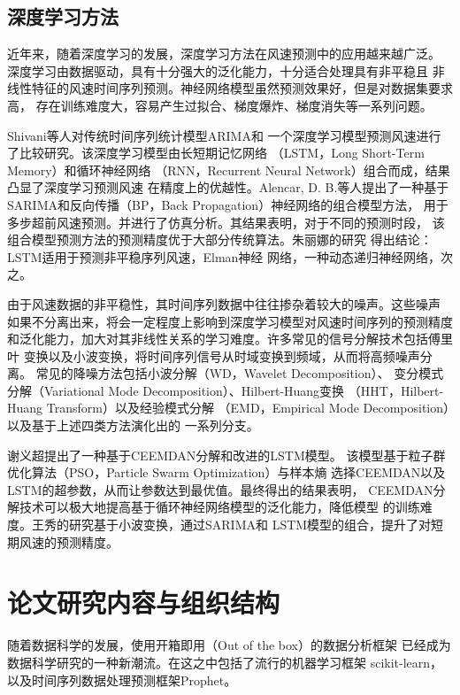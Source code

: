 \documentclass[AutoFakeBold]{LZUThesis}
\begin{document}
\subsection{深度学习方法}

近年来，随着深度学习的发展，深度学习方法在风速预测中的应用越来越广泛。
深度学习由数据驱动，具有十分强大的泛化能力，十分适合处理具有非平稳且
非线性特征的风速时间序列预测。神经网络模型虽然预测效果好，但是对数据集要求高，
存在训练难度大，容易产生过拟合、梯度爆炸、梯度消失等一系列问题。

Shivani等人对传统时间序列统计模型ARIMA和
一个深度学习模型预测风速进行了比较研究。该深度学习模型由长短期记忆网络
（LSTM，Long Short-Term Memory）和循环神经网络
（RNN，Recurrent Neural Network）组合而成，结果凸显了深度学习预测风速
在精度上的优越性。Alencar, D. B.等人提出了一种基于
SARIMA和反向传播（BP，Back Propagation）神经网络的组合模型方法，
用于多步超前风速预测。并进行了仿真分析。其结果表明，对于不同的预测时段，
该组合模型预测方法的预测精度优于大部分传统算法。朱丽娜的研究
得出结论：LSTM适用于预测非平稳序列风速，Elman神经
网络，一种动态递归神经网络，次之。

由于风速数据的非平稳性，其时间序列数据中往往掺杂着较大的噪声。这些噪声
如果不分离出来，将会一定程度上影响到深度学习模型对风速时间序列的预测精度
和泛化能力，加大对其非线性关系的学习难度。许多常见的信号分解技术包括傅里叶
变换以及小波变换，将时间序列信号从时域变换到频域，从而将高频噪声分离。
常见的降噪方法包括小波分解（WD，Wavelet Decomposition）、
变分模式分解（Variational Mode Decomposition）、Hilbert-Huang变换
（HHT，Hilbert-Huang Transform）以及经验模式分解
（EMD，Empirical Mode Decomposition）以及基于上述四类方法演化出的
一系列分支。

谢义超提出了一种基于CEEMDAN分解和改进的LSTM模型。
该模型基于粒子群优化算法（PSO，Particle Swarm Optimization）与样本熵
选择CEEMDAN以及LSTM的超参数，从而让参数达到最优值。最终得出的结果表明，
CEEMDAN分解技术可以极大地提高基于循环神经网络模型的泛化能力，降低模型
的训练难度。王秀的研究基于小波变换，通过SARIMA和
LSTM模型的组合，提升了对短期风速的预测精度。

\section{论文研究内容与组织结构}

随着数据科学的发展，使用开箱即用（Out of the box）的数据分析框架
已经成为数据科学研究的一种新潮流。在这之中包括了流行的机器学习框架
scikit-learn，以及时间序列数据处理预测框架Prophet。
\end{document}
